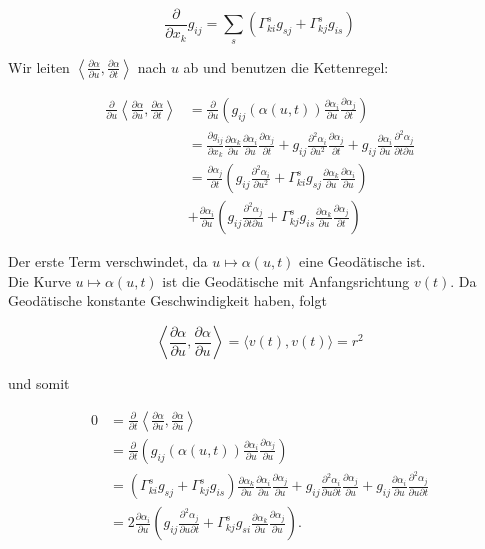 \documentclass[10pt]{article}
\begin{document}
$$
\frac{\partial}{\partial x_{k}} g_{i j}=\sum_{s}\left(\Gamma_{k i}^{s} g_{s j}+\Gamma_{k j}^{s} g_{i s}\right)
$$

Wir leiten $\left\langle\frac{\partial \alpha}{\partial u}, \frac{\partial \alpha}{\partial t}\right\rangle$ nach $u$ ab und benutzen die Kettenregel:

$$
\begin{aligned}
\frac{\partial}{\partial u}\left\langle\frac{\partial \alpha}{\partial u}, \frac{\partial \alpha}{\partial t}\right\rangle & =\frac{\partial}{\partial u}\left(g_{i j}(\alpha(u, t)) \frac{\partial \alpha_{i}}{\partial u} \frac{\partial \alpha_{j}}{\partial t}\right) \\
& =\frac{\partial g_{i j}}{\partial x_{k}} \frac{\partial \alpha_{k}}{\partial u} \frac{\partial \alpha_{i}}{\partial u} \frac{\partial \alpha_{j}}{\partial t}+g_{i j} \frac{\partial^{2} \alpha_{i}}{\partial u^{2}} \frac{\partial \alpha_{j}}{\partial t}+g_{i j} \frac{\partial \alpha_{i}}{\partial u} \frac{\partial^{2} \alpha_{j}}{\partial t \partial u} \\
& =\frac{\partial \alpha_{j}}{\partial t}\left(g_{i j} \frac{\partial^{2} \alpha_{i}}{\partial u^{2}}+\Gamma_{k i}^{s} g_{s j} \frac{\partial \alpha_{k}}{\partial u} \frac{\partial \alpha_{i}}{\partial u}\right) \\
& +\frac{\partial \alpha_{i}}{\partial u}\left(g_{i j} \frac{\partial^{2} \alpha_{j}}{\partial t \partial u}+\Gamma_{k j}^{s} g_{i s} \frac{\partial \alpha_{k}}{\partial u} \frac{\partial \alpha_{j}}{\partial t}\right)
\end{aligned}
$$

Der erste Term verschwindet, da $u \mapsto \alpha(u, t)$ eine Geodätische ist.\\
Die Kurve $u \mapsto \alpha(u, t)$ ist die Geodätische mit Anfangsrichtung $v(t)$. Da Geodätische konstante Geschwindigkeit haben, folgt

$$
\left\langle\frac{\partial \alpha}{\partial u}, \frac{\partial \alpha}{\partial u}\right\rangle=\langle v(t), v(t)\rangle=r^{2}
$$

und somit

$$
\begin{aligned}
0 & =\frac{\partial}{\partial t}\left\langle\frac{\partial \alpha}{\partial u}, \frac{\partial \alpha}{\partial u}\right\rangle \\
& =\frac{\partial}{\partial t}\left(g_{i j}(\alpha(u, t)) \frac{\partial \alpha_{i}}{\partial u} \frac{\partial \alpha_{j}}{\partial u}\right) \\
& =\left(\Gamma_{k i}^{s} g_{s j}+\Gamma_{k j}^{s} g_{i s}\right) \frac{\partial \alpha_{k}}{\partial u} \frac{\partial \alpha_{i}}{\partial u} \frac{\partial \alpha_{j}}{\partial u}+g_{i j} \frac{\partial^{2} \alpha_{i}}{\partial u \partial t} \frac{\partial \alpha_{j}}{\partial u}+g_{i j} \frac{\partial \alpha_{i}}{\partial u} \frac{\partial^{2} \alpha_{j}}{\partial u \partial t} \\
& =2 \frac{\partial \alpha_{i}}{\partial u}\left(g_{i j} \frac{\partial^{2} \alpha_{j}}{\partial u \partial t}+\Gamma_{k j}^{s} g_{s i} \frac{\partial \alpha_{k}}{\partial u} \frac{\partial \alpha_{j}}{\partial u}\right) .
\end{aligned}
$$
\end{document}
